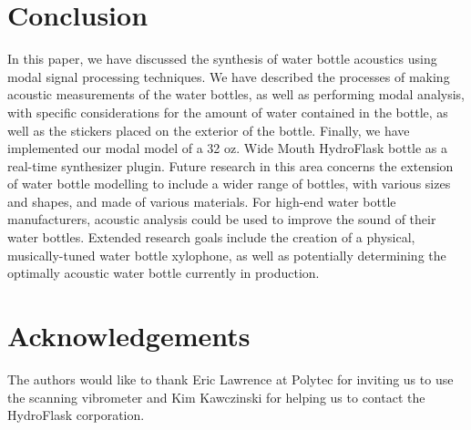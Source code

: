 \documentclass[twoside,a4paper]{article}
\begin{document}
%
\section{Conclusion} \label{sec:conclusion}
%
In this paper, we have discussed the synthesis of water bottle acoustics
using modal signal processing techniques. We have described the processes
of making acoustic measurements of the water bottles, as well as performing
modal analysis, with specific considerations for the amount of water
contained in the bottle, as well as the stickers placed on the exterior
of the bottle. Finally, we have implemented our modal model of a 32 oz.
Wide Mouth HydroFlask bottle as a real-time synthesizer plugin.
\newline\newline
Future research in this area concerns the extension of water bottle
modelling to include a wider range of bottles, with various sizes and
shapes, and made of various materials. For high-end water bottle
manufacturers, acoustic analysis could be used to improve the sound
of their water bottles. Extended research goals include the creation
of a physical, musically-tuned water bottle xylophone, as well as potentially
determining the optimally acoustic water bottle currently in production.

\section{Acknowledgements}
%
The authors would like to thank Eric Lawrence at Polytec for inviting us to use the scanning vibrometer and Kim Kawczinski for helping us to contact
the HydroFlask corporation.

\nocite{*}


\end{document}
